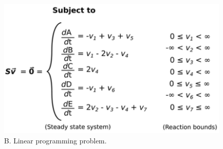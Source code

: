 \documentclass[8pt]{beamer}
\begin{document}
\begin{frame}
{\begin{minipage}{0.5\textwidth}
\end{minipage}%
\begin{minipage}{0.5\textwidth}
\begin{figure}
\includegraphics[width=\textwidth]{figures/mass-balance-3}
\caption{B. Linear programming problem.}
\end{figure}

\end{minipage}



}
\end{frame}
\end{document}
